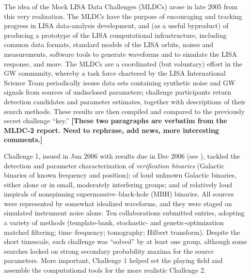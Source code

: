 \documentclass{iopart}
\begin{document}
The idea of the Mock LISA Data Challenges (MLDCs) arose in late 2005 from this very realization. The MLDCs have the purpose of encouraging and tracking progress in LISA data-analysis development, and (as a useful byproduct) of producing a prototype of the LISA computational infrastructure, including common data formats, standard models of the LISA orbits, noises and measurements, software tools to generate waveforms and to simulate the LISA response, and more. The MLDCs are a coordinated (but voluntary) effort in the GW community, whereby a task force chartered by the LISA International Science Team periodically issues data sets containing synthetic noise and GW signals from sources of undisclosed parameters; challenge participants return detection candidates and parameter estimates, together with descriptions of their search methods. These results are then compiled and compared to the previously secret challenge ``key.'' \textbf{[These two paragraphs are verbatim from the MLDC-2 report. Need to rephrase, add news, more interesting comments.]}

Challenge 1, issued in Jun 2006 with results due in Dec 2006 (see \cite{mldclisasymp,mldcgwdaw1}), tackled the detection and parameter characterization of \emph{verification binaries} (Galactic binaries of known frequency and position); of loud unknown Galactic binaries, either alone or in small, moderately interfering groups; and of relatively loud inspirals of nonspinning supermassive--black-hole (MBH) binaries. All sources were represented by somewhat idealized waveforms, and they were staged on simulated instrument noise alone. Ten collaborations submitted entries, adopting a variety of methods (template-bank, stochastic- and genetic-optimization matched filtering; time--frequency; tomography; Hilbert transform). Despite the short timescale, each challenge was ``solved'' by at least one group, although some searches locked on strong secondary probability maxima for the source parameters. More important, Challenge 1 helped set the playing field and assemble the computational tools for the more realistic Challenge 2.
\end{document}
